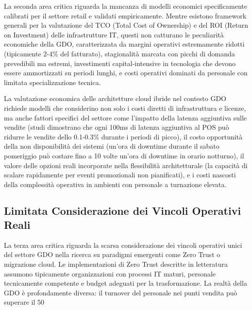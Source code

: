 La seconda area critica riguarda la mancanza di modelli economici specificamente calibrati per il settore retail e validati empiricamente. Mentre esistono framework generali per la valutazione del TCO (Total Cost of Ownership) e del ROI (Return on Investment) delle infrastrutture IT, questi non catturano le peculiarità economiche della GDO, caratterizzata da margini operativi estremamente ridotti (tipicamente 2-4\% del fatturato), stagionalità marcata con picchi di domanda prevedibili ma estremi, investimenti capital-intensive in tecnologia che devono essere ammortizzati su periodi lunghi, e costi operativi dominati da personale con limitata specializzazione tecnica.

La valutazione economica delle architetture cloud ibride nel contesto GDO richiede modelli che considerino non solo i costi diretti di infrastruttura e licenze, ma anche fattori specifici del settore come l'impatto della latenza aggiuntiva sulle vendite (studi dimostrano che ogni 100ms di latenza aggiuntiva al POS può ridurre le vendite dello 0.1-0.3\% durante i periodi di picco), il costo opportunità della non disponibilità dei sistemi (un'ora di downtime durante il sabato pomeriggio può costare fino a 10 volte un'ora di downtime in orario notturno), il valore delle opzioni reali incorporate nella flessibilità architetturale (la capacità di scalare rapidamente per eventi promozionali non pianificati), e i costi nascosti della complessità operativa in ambienti con personale a turnazione elevata.

\subsection{Limitata Considerazione dei Vincoli Operativi Reali}

La terza area critica riguarda la scarsa considerazione dei vincoli operativi unici del settore GDO nella ricerca su paradigmi emergenti come Zero Trust o migrazione cloud. Le implementazioni di Zero Trust descritte in letteratura assumono tipicamente organizzazioni con processi IT maturi, personale tecnicamente competente e budget adeguati per la trasformazione. La realtà della GDO è profondamente diversa: il turnover del personale nei punti vendita può superare il 50%

